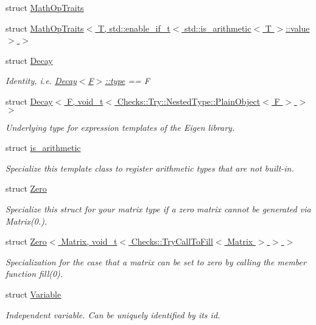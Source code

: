 \begin{DoxyCompactItemize}
struct \hyperlink{structfuncy_1_1MathOpTraits}{Math\-Op\-Traits}
\item 
struct \hyperlink{structfuncy_1_1MathOpTraits_3_01T_00_01std_1_1enable__if__t_3_01std_1_1is__arithmetic_3_01T_01_4_1_1value_01_4_01_4}{Math\-Op\-Traits$<$ T, std\-::enable\-\_\-if\-\_\-t$<$ std\-::is\-\_\-arithmetic$<$ T $>$\-::value $>$ $>$}
\item 
struct \hyperlink{structfuncy_1_1Decay}{Decay}
\begin{DoxyCompactList}\small\item\em Identity, i.\-e. \hyperlink{structfuncy_1_1Decay_a94829178cc43a1c71c43511c8a8836c6}{Decay$<$\-F$>$\-::type} == F \end{DoxyCompactList}\item 
struct \hyperlink{structfuncy_1_1Decay_3_01F_00_01void__t_3_01Checks_1_1Try_1_1NestedType_1_1PlainObject_3_01F_01_4_01_4_01_4}{Decay$<$ F, void\-\_\-t$<$ Checks\-::\-Try\-::\-Nested\-Type\-::\-Plain\-Object$<$ F $>$ $>$ $>$}
\begin{DoxyCompactList}\small\item\em Underlying type for expression templates of the Eigen library. \end{DoxyCompactList}\item 
struct \hyperlink{structfuncy_1_1is__arithmetic}{is\-\_\-arithmetic}
\begin{DoxyCompactList}\small\item\em Specialize this template class to register arithmetic types that are not built-\/in. \end{DoxyCompactList}\item 
struct \hyperlink{structfuncy_1_1Zero}{Zero}
\begin{DoxyCompactList}\small\item\em Specialize this struct for your matrix type if a zero matrix cannot be generated via Matrix(0.). \end{DoxyCompactList}\item 
struct \hyperlink{structfuncy_1_1Zero_3_01Matrix_00_01void__t_3_01Checks_1_1TryCallToFill_3_01Matrix_01_4_01_4_01_4}{Zero$<$ Matrix, void\-\_\-t$<$ Checks\-::\-Try\-Call\-To\-Fill$<$ Matrix $>$ $>$ $>$}
\begin{DoxyCompactList}\small\item\em Specialization for the case that a matrix can be set to zero by calling the member function fill(0). \end{DoxyCompactList}\item 
struct \hyperlink{structfuncy_1_1Variable}{Variable}
\begin{DoxyCompactList}\small\item\em Independent variable. Can be uniquely identified by its id. \end{DoxyCompactList}\end{DoxyCompactItemize}
